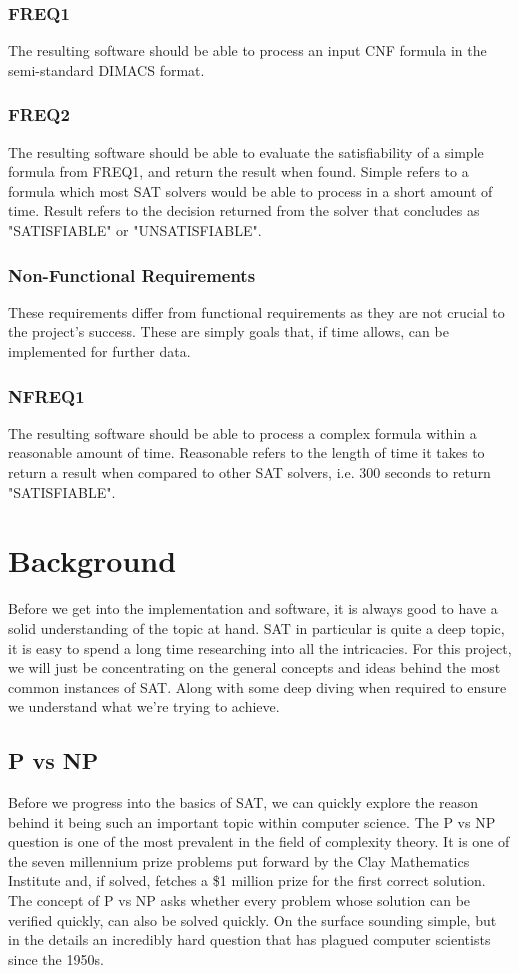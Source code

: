 \documentclass{article}
\begin{document}
\subsubsection{FREQ1}
The resulting software should be able to process an input CNF formula in the semi-standard DIMACS format.

\subsubsection{FREQ2}
The resulting software should be able to evaluate the satisfiability of a simple formula from FREQ1, and return the result when
found. Simple refers to a formula which most SAT solvers would be able to process in a short amount of time. Result refers to the
decision returned from the solver that concludes as "SATISFIABLE" or "UNSATISFIABLE".

\subsubsection{Non-Functional Requirements}
These requirements differ from functional requirements as they are not crucial to the project's success. These are simply goals
that, if time allows, can be implemented for further data.

\subsubsection{NFREQ1}
The resulting software should be able to process a complex formula within a reasonable amount of time. Reasonable refers to the
length of time it takes to return a result when compared to other SAT solvers, i.e. 300 seconds to return "SATISFIABLE".

\section{Background}
Before we get into the implementation and software, it is always good to have a solid understanding
of the topic at hand. SAT in particular is quite a deep topic, it is easy to spend a long time
researching into all the intricacies. For this project, we will just be concentrating on the
general concepts and ideas behind the most common instances of SAT. Along with some deep diving when required to ensure we
understand what we're trying to achieve.

\subsection{P vs NP}
Before we progress into the basics of SAT, we can quickly explore the reason behind it being such an
important topic within computer science. The P vs NP question is one of the most prevalent in the
field of complexity theory. It is one of the seven millennium prize problems put forward by the Clay
Mathematics Institute and, if solved, fetches a \$1 million prize for the first correct solution.
The concept of P vs NP asks whether every problem whose solution can be verified quickly, can also
be solved quickly. On the surface sounding simple, but in the details an incredibly hard question
that has plagued computer scientists since the 1950s.
\end{document}

